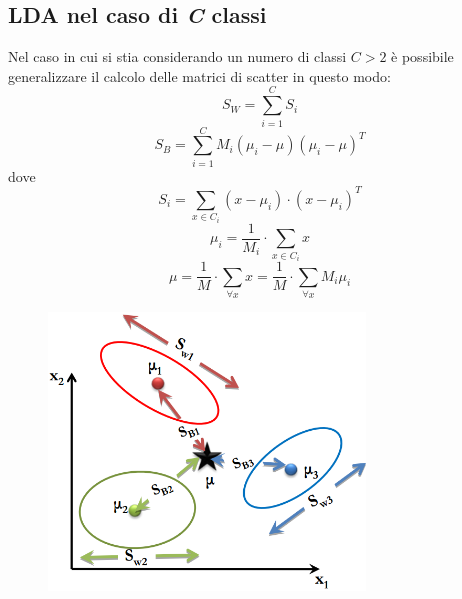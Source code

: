 \documentclass[a4paper,oneside,titlepage]{book}
\begin{document}
\subsection{LDA nel caso di \textit{C} classi}
Nel caso in cui si stia considerando un numero di classi $C > 2$ è possibile generalizzare il calcolo delle matrici di scatter in questo modo:
\[ S_W = \sum_{i = 1}^C S_i \]
\[ S_B = \sum_{i = 1}^C M_i (\mu_i - \mu) (\mu_i - \mu)^T \]
dove
\[ S_i = \sum_{x \in C_i} (x - \mu_i) \cdot (x - \mu_i)^T \]
\[ \mu_i = \frac{1}{M_i} \cdot \sum_{x \in C_i} x \]
\[ \mu = \frac{1}{M} \cdot \sum_{\forall x} x = \frac{1}{M} \cdot \sum_{\forall x} M_i \mu_i \]
\begin{figure}[htp]
	\centering
	\includegraphics[width=0.75\textwidth]{lda3.png}
\end{figure}
\end{document}
